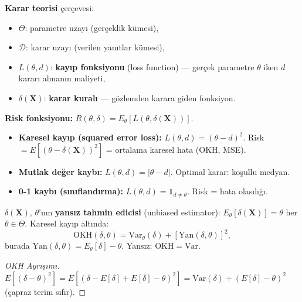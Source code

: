 \begin{tanim}
\label{def:karar}
\textbf{Karar teorisi} çerçevesi:
\begin{itemize}
  \item $\Theta$: parametre uzayı (gerçeklik kümesi),
  \item $\mathcal{D}$: karar uzayı (verilen yanıtlar kümesi),
  \item $L(\theta, d)$: \textbf{kayıp fonksiyonu} (loss function) ---
        gerçek parametre $\theta$ iken $d$ kararı almanın maliyeti,
  \item $\delta(\mathbf{X})$: \textbf{karar kuralı} --- gözlemden karara giden fonksiyon.
\end{itemize}
\textbf{Risk fonksiyonu:} $R(\theta, \delta) = E_\theta[L(\theta, \delta(\mathbf{X}))]$.
\end{tanim}

\begin{ornek}
\begin{itemize}
  \item \textbf{Karesel kayıp (squared error loss):} $L(\theta, d) = (\theta - d)^2$.
        Risk $= E[(\theta - \delta(\mathbf{X}))^2]$ = ortalama karesel hata (OKH, MSE).
  \item \textbf{Mutlak değer kaybı:} $L(\theta, d) = |\theta - d|$.
        Optimal karar: koşullu medyan.
  \item \textbf{0-1 kaybı (sınıflandırma):} $L(\theta, d) = \mathbf{1}_{d\neq\theta}$.
        Risk = hata olasılığı.
\end{itemize}
\end{ornek}

\begin{tanim}
\label{def:yansizlik_okh}
$\delta(\mathbf{X})$, $\theta$'nın \textbf{yansız tahmin edicisi} (unbiased estimator):
$E_\theta[\delta(\mathbf{X})] = \theta$ her $\theta \in \Theta$.
Karesel kayıp altında:
\[
  \mathrm{OKH}(\delta, \theta) = \mathrm{Var}_\theta(\delta) + [\mathrm{Yan}(\delta, \theta)]^2,
\]
burada $\mathrm{Yan}(\delta,\theta) = E_\theta[\delta] - \theta$. Yansız: $\mathrm{OKH} = \mathrm{Var}$.
\end{tanim}

\begin{proof}[OKH Ayrışımı]
$E[(\delta-\theta)^2] = E[(\delta - E[\delta] + E[\delta]-\theta)^2]
= \mathrm{Var}(\delta) + (E[\delta]-\theta)^2$ (çapraz terim sıfır).
\end{proof}

